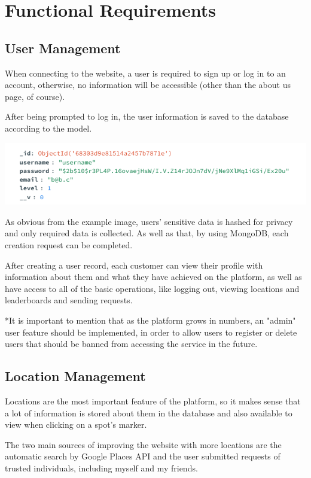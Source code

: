 \documentclass[12pt,a4paper]{report}
\begin{document}
\section{Functional Requirements}
\subsection{User Management}
When connecting to the website, a user is required to sign up or log in to an account, otherwise, no information will be accessible (other than the about us page, of course).

After being prompted to log in, the user information is saved to the database according to the model. 

\begin{center}
\includegraphics[width=1\textwidth]{images/user db.png}
\end{center}

As obvious from the example image, users' sensitive data is hashed for privacy and only required data is collected. As well as that, by using MongoDB, each creation request can be completed.

After creating a user record, each customer can view their profile with information about them and what they have achieved on the platform, as well as have access to all of the basic operations, like logging out, viewing locations and leaderboards and sending requests.

*It is important to mention that as the platform grows in numbers, an "admin" user feature should be implemented, in order to allow users to register or delete users that should be banned from accessing the service in the future.

\subsection{Location Management}
Locations are the most important feature of the platform, so it makes sense that a lot of information is stored about them in the database and also available to view when clicking on a spot's marker.

The two main sources of improving the website with more locations are the automatic search by Google Places API and the user submitted requests of trusted individuals, including myself and my friends.
\end{document}
